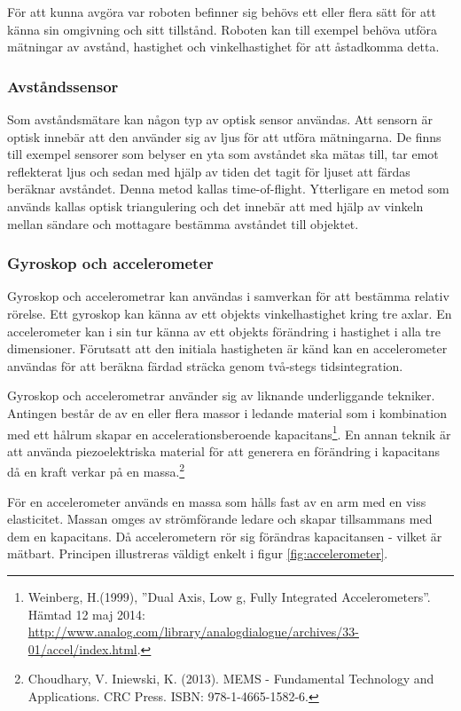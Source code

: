 \documentclass[a4paper,12pt,fleqn]{article}
\begin{document}
För att kunna avgöra var roboten befinner sig behövs ett eller flera sätt för att känna sin omgivning och sitt tillstånd. Roboten kan till exempel behöva utföra mätningar av avstånd, hastighet och vinkelhastighet för att åstadkomma detta. 

\subsubsection{Avståndssensor}

Som avståndsmätare kan någon typ av optisk sensor användas. Att sensorn är optisk innebär att den använder sig av ljus för att utföra mätningarna. De finns till exempel sensorer som belyser en yta som avståndet ska mätas till, tar emot reflekterat ljus och sedan med hjälp av tiden det tagit för ljuset att färdas beräknar avståndet. Denna metod kallas time-of-flight. Ytterligare en metod som används kallas optisk triangulering och det innebär att med hjälp av vinkeln mellan sändare och mottagare bestämma avståndet till objektet.
\newpage

\subsubsection{Gyroskop och accelerometer}

Gyroskop och accelerometrar kan användas i samverkan för att bestämma relativ rörelse. Ett gyroskop kan känna av ett objekts vinkelhastighet kring tre axlar. En accelerometer kan i sin tur känna av ett objekts förändring i hastighet i alla tre dimensioner. Förutsatt att den initiala hastigheten är känd kan en accelerometer användas för att beräkna färdad sträcka genom två-stegs tidsintegration. 

Gyroskop och accelerometrar använder sig av liknande underliggande tekniker. Antingen består de av en eller flera massor i ledande material som i kombination med ett hålrum skapar en accelerationsberoende kapacitans\footnote{Weinberg, H.(1999), ''Dual Axis, Low g, Fully Integrated Accelerometers''. Hämtad 12 maj 2014: \url{http://www.analog.com/library/analogdialogue/archives/33-01/accel/index.html}.}. En annan teknik är att använda piezoelektriska material för att generera en förändring i kapacitans då en kraft verkar på en massa.\footnote{Choudhary, V. Iniewski, K. (2013). MEMS - Fundamental Technology and Applications. CRC Press. ISBN: 978-1-4665-1582-6.} 

För en accelerometer används en massa som hålls fast av en arm med en viss elasticitet. Massan omges av strömförande ledare och skapar tillsammans med dem en kapacitans. Då accelerometern rör sig förändras kapacitansen - vilket är mätbart. Principen illustreras väldigt enkelt i figur \ref{fig:accelerometer}.
\end{document}
